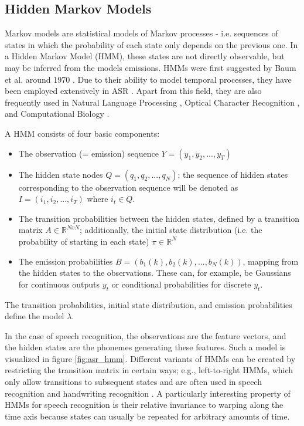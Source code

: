\subsection{Hidden Markov Models}

    Markov models are statistical models of Markov processes - i.e. sequences of states in which the probability of each state only depends on the previous one. 
    In a Hidden Markov Model (HMM), these states are not directly observable, but may be inferred from the models emissions. 
    HMMs were first suggested by Baum et al. around 1970 \cite{baum1}\cite{baum2}\cite{baum3}\cite{baum4}\cite{baum5}. 
    Due to their ability to model temporal processes, they have been employed extensively in ASR \cite{rabiner_hmm1}\cite{rabiner_hmm2}\cite{jelinek}\cite{gales_young_hmm}. 
    Apart from this field, they are also frequently used in Natural Language Processing \cite{manning_schuetze}, Optical Character Recognition \cite{nag}, and Computational Biology \cite{krogh}\cite{durbin}.

    A HMM consists of four basic components:
    \begin{itemize}
        \item The observation (= emission) sequence $Y = (y_1, y_2, ..., y_T)$
        \item The hidden state nodes $Q = (q_1, q_2, ..., q_N)$; the sequence of hidden states corresponding to the observation sequence will be denoted as $I = (i_1, i_2, ..., i_T)$ where $i_t \in Q$.
        \item The transition probabilities between the hidden states, defined by a transition matrix $A \in \mathbb{R}^{N x N}$; additionally, the initial state distribution (i.e. the probability of starting in each state) $\pi \in \mathbb{R}^N$
        \item The emission probabilities $B = (b_1(k), b_2(k), ..., b_N(k))$, mapping from the hidden states to the observations. These can, for example, be Gaussians for continuous outputs $y_t$ or conditional probabilities for discrete $y_t$.
    \end{itemize}
    The transition probabilities, initial state distribution, and emission probabilities define the model $\lambda$.

    In the case of speech recognition, the observations are the feature vectors, and the hidden states are the phonemes generating these features. 
    Such a model is visualized in figure \ref{fig:asr_hmm}. 
    Different variants of HMMs can be created by restricting the transition matrix in certain ways; e.g., left-to-right HMMs, which only allow transitions to subsequent states and are often used in speech recognition and handwriting recognition \cite{bishop}. 
    A particularly interesting property of HMMs for speech recognition is their relative invariance to warping along the time axis because states can usually be repeated for arbitrary amounts of time.

